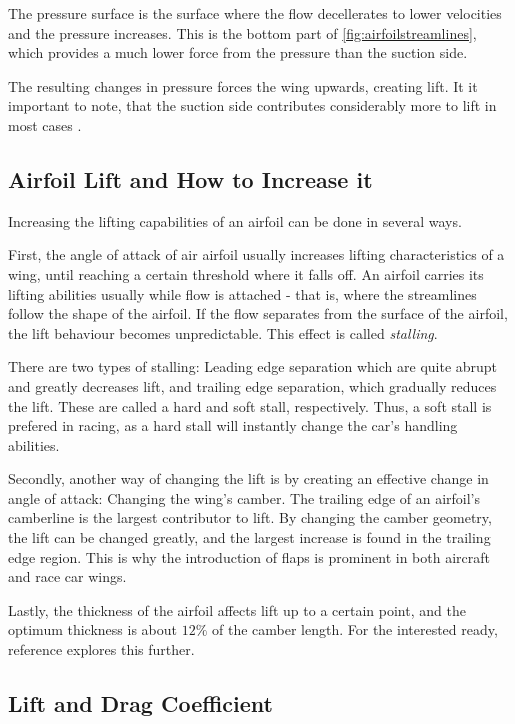   The pressure surface is the surface where the flow decellerates to lower velocities and the pressure increases. This is the bottom part of \ref{fig:airfoilstreamlines}, which provides a much lower force from the pressure than the suction side.

  The resulting changes in pressure forces the wing upwards, creating lift. It it important to note, that the suction side contributes considerably more to lift in most cases \cite{jkatz}.

  \subsection{Airfoil Lift and How to Increase it}

    Increasing the lifting capabilities of an airfoil can be done in several ways.

    First, the angle of attack of air airfoil usually increases lifting characteristics of a wing, until reaching a certain threshold where it falls off. An airfoil carries its lifting abilities usually while flow is attached - that is, where the streamlines follow the shape of the airfoil. If the flow separates from the surface of the airfoil, the lift behaviour becomes unpredictable. This effect is called \emph{stalling}.

    There are two types of stalling: Leading edge separation which are quite abrupt and greatly decreases lift, and trailing edge separation, which gradually reduces the lift. These are called a hard and soft stall, respectively. Thus, a soft stall is prefered in racing, as a hard stall will instantly change the car's handling abilities.

    Secondly, another way of changing the lift is by creating an effective change in angle of attack: Changing the wing's camber. The trailing edge of an airfoil's camberline is the largest contributor to lift. By changing the camber geometry, the lift can be changed greatly, and the largest increase is found in the trailing edge region. This is why the introduction of flaps is prominent in both aircraft and race car wings.

    Lastly, the thickness of the airfoil affects lift up to a certain point, and the optimum thickness is about $12\%$ of the camber length. For the interested ready, reference \cite{jkatz} explores this further.

  \subsection{Lift and Drag Coefficient}

